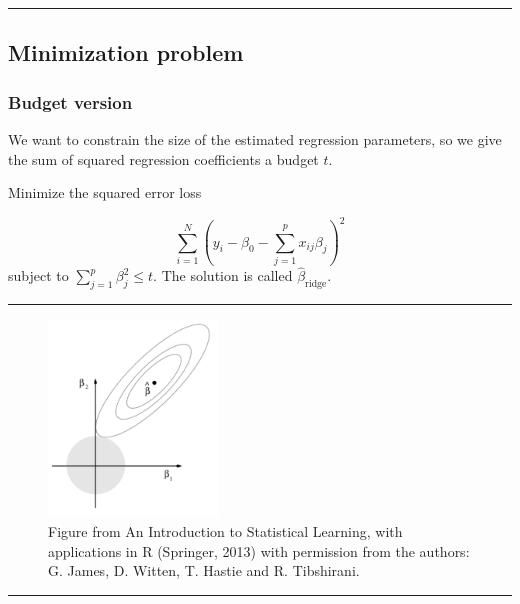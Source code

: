 \documentclass[
  letterpaper,
  DIV=11,
  numbers=noendperiod]{scrartcl}
\begin{document}
\begin{center}\rule{0.5\linewidth}{0.5pt}\end{center}

\hypertarget{minimization-problem}{%
\subsection{Minimization problem}\label{minimization-problem}}

\hypertarget{budget-version}{%
\subsubsection{Budget version}\label{budget-version}}

We want to constrain the size of the estimated regression parameters, so
we give the sum of squared regression coefficients a budget \(t\).

Minimize the squared error loss

\[ \sum_{i=1}^N (y_i-\beta_0-\sum_{j=1}^p x_{ij}\beta_j )^2 \] subject
to \(\sum_{j=1}^p \beta_j^2 \le t\). The solution is called
\(\hat{\beta}_{\text{ridge}}\).

\begin{center}\rule{0.5\linewidth}{0.5pt}\end{center}

\begin{figure}

{\centering \includegraphics[width=0.4\textwidth,height=\textheight]{./ILS67ridge.png}

}

\caption{Figure from An Introduction to Statistical Learning, with
applications in R (Springer, 2013) with permission from the authors: G.
James, D. Witten, T. Hastie and R. Tibshirani.}

\end{figure}

\begin{center}\rule{0.5\linewidth}{0.5pt}\end{center}
\end{document}

